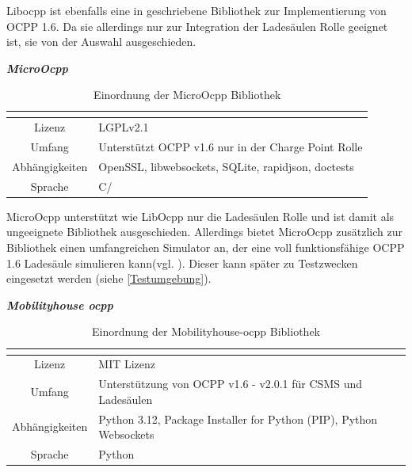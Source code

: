 \noindent Libocpp ist ebenfalls eine in \cpp geschriebene Bibliothek zur Implementierung von \acs{OCPP} 1.6. Da sie allerdings nur zur Integration der Ladesäulen Rolle geeignet ist, sie von der Auswahl ausgeschieden. \\
\begin{table}[H]
	\textbf{\textit{MicroOcpp}}\cite{MicroOcpp}\\
	\begin{tabularx}{\textwidth}{| c | X |}
		\multicolumn{1}{c}{} & \multicolumn{1}{c}{}\\ \hline
		Lizenz & LGPLv2.1\newline \\
		Umfang & Unterstützt OCPP v1.6 nur in der Charge Point Rolle\newline \\
		Abhängigkeiten & OpenSSL, libwebsockets, SQLite, rapidjson, doctests\newline \\
		Sprache & C/\cpp\\ \hline
	\end{tabularx}
	\caption{\label{tab:test_tabelle} Einordnung der MicroOcpp Bibliothek \cite{Eigene_Darstellung}}
\end{table}

\noindent MicroOcpp unterstützt wie LibOcpp nur die Ladesäulen Rolle und ist damit als ungeeignete Bibliothek ausgeschieden. Allerdings bietet MicroOcpp zusätzlich zur Bibliothek einen umfangreichen Simulator an, der eine voll funktionsfähige OCPP 1.6 Ladesäule simulieren kann(vgl. \cite{MicroOcpp-Simulator}). Dieser kann später zu Testzwecken eingesetzt werden (siehe \autoref{Testumgebung}).
\begin{table}[H]
	\textbf{\textit{Mobilityhouse ocpp}} \cite{Mobilityhouse-ocpp}\\
	\begin{tabularx}{\textwidth}{| c | X |}
		\multicolumn{1}{c}{} & \multicolumn{1}{c}{}\\ \hline
		Lizenz & \acs{MIT} Lizenz\newline \\
		Umfang & Unterstützung von OCPP v1.6 - v2.0.1 für \acs{CSMS} und Ladesäulen \newline \\
		Abhängigkeiten & Python 3.12, Package Installer for Python (PIP), Python Websockets \newline \\
		Sprache & Python\\ \hline
	\end{tabularx}
	\caption{\label{tab:test_tabelle} Einordnung der Mobilityhouse-ocpp Bibliothek \cite{Eigene_Darstellung}}
\end{table}

